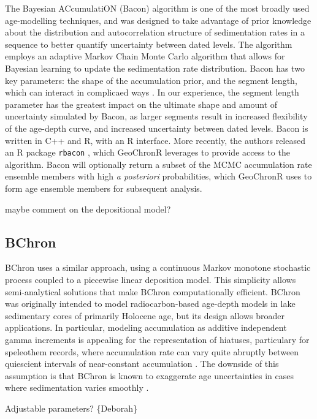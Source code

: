 \documentclass[gc, manuscript]{copernicus}
\begin{document}
The Bayesian ACcumulatiON (Bacon) algorithm \citep{bacon} is one of the most broadly used age-modelling techniques, and was designed to take advantage of prior knowledge about the distribution and autocorrelation structure of sedimentation rates in a sequence to better quantify uncertainty between dated levels.
The algorithm employs an adaptive Markov Chain Monte Carlo algorithm that allows for Bayesian learning to update the sedimentation rate distribution.
Bacon has two key parameters: the shape of the accumulation prior, and the segment length, which can interact in complicaed ways \citep{trachsel2017}.
In our experience, the segment length parameter has the greatest impact on the ultimate shape and amount of uncertainty simulated by Bacon, as larger segments result in increased flexibility of the age-depth curve, and increased uncertainty between dated levels.
Bacon is written in C++ and R, with an R interface.
More recently, the authors released an R package \texttt{rbacon} \citep{baconPackage}, which GeoChronR leverages to provide access to the algorithm.
Bacon will optionally return a subset of the MCMC accumulation rate ensemble members with high \emph{a posteriori} probabilities, which GeoChronR uses to form age ensemble members for subsequent analysis.

maybe comment on the depositional model?

\subsection{BChron}

BChron \citep[\citet{parnell2008flexible}]{bchron} uses a similar approach, using a continuous Markov monotone stochastic process coupled to a piecewise linear deposition model. This simplicity allows semi-analytical solutions that make BChron computationally efficient. BChron was originally intended to model radiocarbon-based age-depth models in lake sedimentary cores of primarily Holocene age, but its design allows broader applications. In particular, modeling accumulation as additive independent gamma increments is appealing for the representation of hiatuses, particulary for speleothem records, where accumulation rate can vary quite abruptly between quiescient intervals of near-constant accumulation \citep[\citet{PRYSM},\citet{Hu_epsl17}]{Parnell_QSR2011}. The downside of this assumption is that BChron is known to exaggerate age uncertainties in cases where sedimentation varies smoothly \citep{trachsel2017}.

Adjustable parameters? \{Deborah\}
\end{document}
